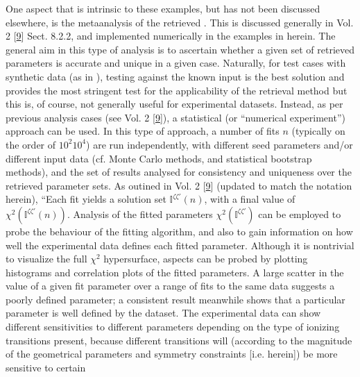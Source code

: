 \documentclass[letterpaper,table,10pt,english]{jupyterBook}
\begin{document}
\sphinxAtStartPar
One aspect that is intrinsic to these examples, but has not been discussed elsewhere, is the meta\sphinxhyphen{}analysis of the retrieved {\hyperref[\detokenize{backmatter/glossary:term-radial-matrix-elements}]{}}. This is discussed generally in  Vol. 2 {[}\hyperlink{cite.backmatter/bibliography:id677}{9}{]} Sect. 8.2.2, and implemented numerically in the examples in {\hyperref[\detokenize{part2/extracting_matrix_elements_overview_270423:chpt-extracting-matrix-elements-overview}]{}} herein. The general aim in this type of analysis is to ascertain whether a given set of retrieved parameters is accurate and unique in a given case. Naturally, for test cases with synthetic data (as in {\hyperref[\detokenize{part2/extracting_matrix_elements_overview_270423:chpt-extracting-matrix-elements-overview}]{}}), testing against the known input {\hyperref[\detokenize{backmatter/glossary:term-radial-matrix-elements}]{}} is the best solution and provides the most stringent test for the applicability of the retrieval method \sphinxhyphen{} but this is, of course, not generally useful for experimental datasets. Instead, as per previous analysis cases (see  Vol. 2 {[}\hyperlink{cite.backmatter/bibliography:id677}{9}{]}), a statistical (or “numerical experiment”) approach can be used. In this type of approach, a number of fits \(n\) (typically on the order of \(10^2\)\sphinxhyphen{}\(10^4\)) are run independently, with different seed parameters and/or different input data (cf. Monte Carlo methods, and statistical bootstrap methods), and the set of results analysed for consistency and uniqueness over the retrieved parameter sets. As outined in  Vol. 2 {[}\hyperlink{cite.backmatter/bibliography:id677}{9}{]} (updated to match the notation herein), “Each fit yields a solution set \(\mathbb{I}^{\zeta\zeta'}(n)\), with a final value of \(\chi^{2}(\mathbb{I}^{\zeta\zeta'}(n))\). Analysis of the fitted parameters \(\chi^{2}(\mathbb{I}^{\zeta\zeta'})\) can be employed to probe the behaviour of the fitting algorithm, and also to gain information on how well the experimental data defines each fitted parameter. Although it is non\sphinxhyphen{}trivial to visualize the full \(\chi^{2}\) hypersurface, aspects can be probed by plotting histograms and correlation plots of the fitted parameters. A large scatter in the value of a given fit parameter over a range of fits to the same data suggests a poorly defined parameter; a consistent result meanwhile shows that a particular parameter is well defined by the dataset. The experimental data can show different sensitivities to different parameters depending on the type of ionizing transitions present, because different transitions will (according to the magnitude of the geometrical parameters and symmetry constraints {[}i.e. {\hyperref[\detokenize{backmatter/glossary:term-channel-functions}]{}} herein{]}) be more sensitive to certain 
\end{document}
